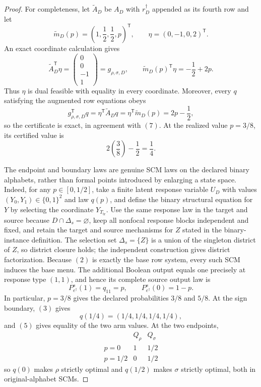 \documentclass{article}
\begin{document}
\begin{proof}
For completeness, let \(\widetilde A_D\) be \(A_D\) with \(r_D^\dagger\) appended as its fourth row and let
\[
\widetilde m_D(p)=\left(1,\frac12,\frac12,p\right)^{\mathsf T},
\qquad
\eta=(0,-1,0,2)^{\mathsf T}.
\]
An exact coordinate calculation gives
\[
\widetilde A_D^{\mathsf T}\eta
=\begin{pmatrix}0\\0\\-1\\1\end{pmatrix}
=g_{\rho,\sigma,D},
\qquad
\widetilde m_D(p)^{\mathsf T}\eta
=-\frac12+2p.
\tag{9}
\]
Thus \(\eta\) is dual feasible with equality in every coordinate.  Moreover, every \(q\) satisfying the augmented row equations obeys
\[
g_{\rho,\sigma,D}^{\mathsf T}q
=\eta^{\mathsf T}\widetilde A_Dq
=\eta^{\mathsf T}\widetilde m_D(p)
=2p-\frac12,
\]
so the certificate is exact, in agreement with \((7)\).  At the realized value \(p=3/8\), its certified value is
\[
2\left(\frac38\right)-\frac12=\frac14.
\tag{10}
\]

The endpoint and boundary laws are genuine SCM laws on the declared binary alphabets, rather than formal points introduced by enlarging a state space.  Indeed, for any \(p\in[0,1/2]\), take a finite latent response variable \(U_D\) with values \((Y_0,Y_1)\in\{0,1\}^2\) and law \(q(p)\), and define the binary structural equation for \(Y\) by selecting the coordinate \(Y_{T_{\mathrm{tr}}}\).  Use the same response law in the target and source because \(D\cap\Delta_s=\varnothing\), keep all nonfocal response blocks independent and fixed, and retain the target and source mechanisms for \(Z\) stated in the binary-instance definition.  The selection set \(\Delta_s=\{Z\}\) is a union of the singleton district of \(Z\), so district closure holds; the independent construction gives district factorization.  Because \((2)\) is exactly the base row system, every such SCM induces the base menu.  The additional Boolean output equals one precisely at response type \((1,1)\), and hence its complete source output law is
\[
P_{e^\dagger}^s(1)=q_{11}=p,
\qquad
P_{e^\dagger}^s(0)=1-p.
\tag{11}
\]
In particular, \(p=3/8\) gives the declared probabilities \(3/8\) and \(5/8\).  At the sign boundary, \((3)\) gives
\[
q(1/4)=(1/4,1/4,1/4,1/4),
\]
and \((5)\) gives equality of the two arm values.  At the two endpoints,
\[
\begin{array}{c|cc}
&Q_\rho&Q_\sigma\\ \hline
p=0&1&1/2\\
p=1/2&0&1/2
\end{array}
\tag{12}
\]
so \(q(0)\) makes \(\rho\) strictly optimal and \(q(1/2)\) makes \(\sigma\) strictly optimal, both in original-alphabet SCMs.


\end{proof}
\end{document}
